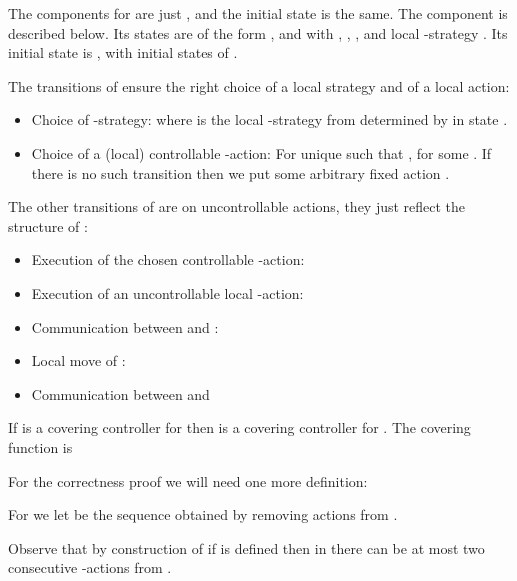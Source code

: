 \documentclass[10pt,a4paper]{article}
\begin{document}
The components  for  are just , and the
initial state is the same. The
component  is described below. Its states are of the form
,  and  with ,
, , and local -strategy . Its
initial state is , with  initial
states of . 

The transitions of  ensure the right choice of a local
strategy and of a local action:

\begin{itemize}
\item Choice of -strategy:
   where  is the local
  -strategy from  determined by  in state .

\item Choice of a (local) controllable -action:
   For  unique such that
  , for some . If there is no such transition then we
  put some arbitrary fixed action .
\end{itemize}

The other transitions of  are on uncontrollable actions,
they just reflect the structure of :
\begin{itemize}
\item Execution of the chosen controllable -action:


\item Execution of an uncontrollable local -action:
  

\item Communication between  and :


\item Local move of :


\item Communication between  and 

\end{itemize}

\begin{lemma}\label{lemma:C is covering}
  If  is a covering controller for  then   is a
  covering controller for . The covering function is
  
\end{lemma}


For the correctness proof we will need one more definition:

\begin{definition}[]
  For  we let  be
  the sequence obtained by removing actions from .
\end{definition}

Observe that by construction of  if  is defined
then in  there can be at most two consecutive -actions from
.
\end{document}
